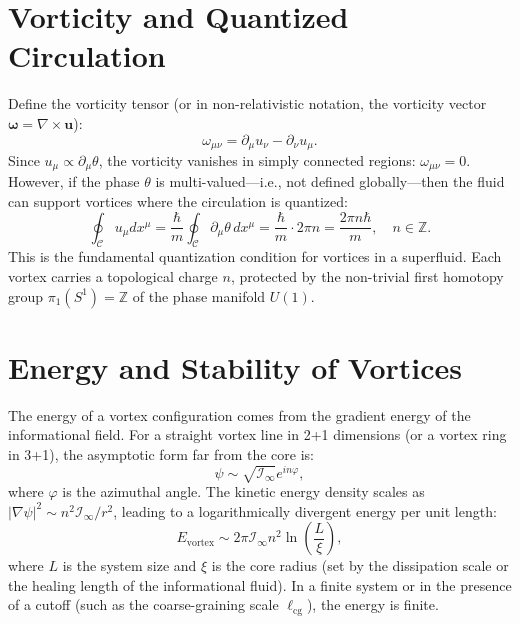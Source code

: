 \documentclass[12pt,a4paper]{book}
\newcommand{\I}{\mathcal{I}}
\begin{document}
\section{Vorticity and Quantized Circulation}

Define the vorticity tensor (or in non-relativistic notation, the vorticity vector $\boldsymbol{\omega} = \nabla \times \mathbf{u}$):
\begin{equation}
    \omega_{\mu\nu} = \partial_\mu u_\nu - \partial_\nu u_\mu.
\end{equation}
Since $u_\mu \propto \partial_\mu \theta$, the vorticity vanishes in simply connected regions: $\omega_{\mu\nu} = 0$. However, if the phase $\theta$ is multi-valued—i.e., not defined globally—then the fluid can support vortices where the circulation is quantized:
\begin{equation}
    \oint_{\mathcal{C}} u_\mu dx^\mu = \frac{\hbar}{m} \oint_{\mathcal{C}} \partial_\mu \theta \, dx^\mu = \frac{\hbar}{m} \cdot 2\pi n = \frac{2\pi n \hbar}{m}, \quad n \in \mathbb{Z}.
\end{equation}
This is the fundamental quantization condition for vortices in a superfluid. Each vortex carries a topological charge $n$, protected by the non-trivial first homotopy group $\pi_1(S^1) = \mathbb{Z}$ of the phase manifold $U(1)$.

\section{Energy and Stability of Vortices}

The energy of a vortex configuration comes from the gradient energy of the informational field. For a straight vortex line in 2+1 dimensions (or a vortex ring in 3+1), the asymptotic form far from the core is:
\begin{equation}
    \psi \sim \sqrt{\I_\infty} e^{in\varphi},
\end{equation}
where $\varphi$ is the azimuthal angle. The kinetic energy density scales as $|\nabla\psi|^2 \sim n^2 \I_\infty / r^2$, leading to a logarithmically divergent energy per unit length:
\begin{equation}
    E_{\text{vortex}} \sim 2\pi \I_\infty n^2 \ln\left(\frac{L}{\xi}\right),
\end{equation}
where $L$ is the system size and $\xi$ is the core radius (set by the dissipation scale or the healing length of the informational fluid). In a finite system or in the presence of a cutoff (such as the coarse-graining scale $\ell_{\text{cg}}$), the energy is finite.
\end{document}

